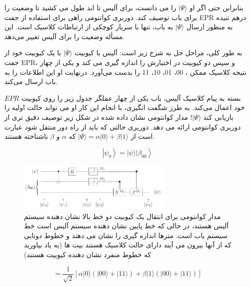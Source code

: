 \documentclass{book}
\begin{document}
بنابراین حتی اگر او $\vert \Psi \rangle$ را می دانست، برای آلیس تا ابد طول می کشید تا وضعیت را برای باب توصیف کند. دوربری کوانتومی راهی برای استفاده از جفت EPR درهم تنیده به منظور ارسال $\vert \Psi \rangle$ به باب، تنها با سربار کوچکی از ارتباطات کلاسیک است. این مسأله وضعیت را برای آلیس تغییر می‌دهد.

به طور کلی، مراحل حل به شرح زیر است: آلیس با کیوبیت $\vert \Psi \rangle$ با یک کیوبیت خود از جفت EPR، و سپس دو کیوبیت در اختیارش را اندازه گیری می کند و یکی از چهار نتیجه کلاسیک ممکن
، 00، 01، 10، 11 را بدست می‌آورد. درنهایت او این اطلاعات را به باب ارسال می‌کند.


 بسته به پیام کلاسیک آلیس، باب یکی از چهار عملگر جدول زیر را روی کیوبیت $EPR$ خود اعمال می‌کند.
 به طرز شگفت انگیزی، با انجام این کار او می تواند حالت اولیه را بازیابی کند $\vert \Psi \rangle$! مدار کوانتومی نشان داده شده در شکل زیر توصیف دقیق تری از دوربری کوانتومی ارائه می دهد.
دوربری حالتی که باید از راه دور منتقل شود عبارت است از $\vert \Psi \rangle = \alpha \vert 0 \rangle + \beta \vert 1 \rangle$ که $\alpha$ و $\beta$ ناشناخته هستند.

\begin{center}
	\begin{equation}\label{psi before spooky action}
		\left.\left|\psi_0\right\rangle=\vert \psi\rangle \vert \beta_{00}\right\rangle
	\end{equation}
\end{center}


\begin{figure}[ht]
	\centering
	\includegraphics[width=3in]{spooky action.png}
	\caption{مدار کوانتومی برای انتقال یک کیوبیت دو خط بالا نشان دهنده سیستم آلیس هستند، در حالی که خط پایین نشان دهنده سیستم آلیس است
		خط سیستم باب است. مترها اندازه گیری را نشان می دهند و خطوط دوتایی که از آنها بیرون می آیند دارای حالت کلاسیک هستند
		بیت ها (به یاد بیاورید که خطوط منفرد نشان دهنده کیوبیت هستند)}
\end{figure}

\begin{center}
	\begin{equation}\label{wide version spooky psi}
		=\frac{1}{\sqrt{2}}[\alpha|0\rangle(|00\rangle+|11\rangle)+\beta|1\rangle(|00\rangle+|11\rangle)]
	\end{equation}
\end{center}
\end{document}
